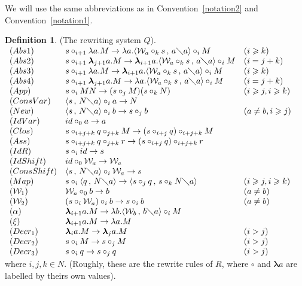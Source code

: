 \documentclass[11pt]{amsart}
\theoremstyle{plain}
\theoremstyle{definition}
\newtheorem{definition}[theorem]{Definition}
\theoremstyle{remark}
\numberwithin{equation}{section}
\newcommand{\ci}{\circ}
\newcommand{\mi}{\,,\,}
\newcommand{\is}{\diagdown}
\newcommand{\arrow}{\rightarrow}
\newcommand{\x}{a}
\newcommand{\y}{b}
\renewcommand{\pi}{\mathcal{W}}
\begin{document}
 We will use the same abbreviations as in
Convention~\ref{notation2} and Convention~\ref{notation1}.
\newpage
\begin{definition}(The rewriting system $Q$).\\[5pt]
$
\begin{array}{lll}
(Abs1) & s\ci_{i+1} \lambda \x.M\rightarrow\lambda \x.\langle
\pi_{\x}\ci_k s\mi \x\is
\x\rangle\ci_i M & (i \geqslant k)\\
(Abs2) & s\ci_{i+1} \boldsymbol{\lambda}_{j+1}
\x.M\rightarrow\boldsymbol{\lambda}_{i+1} \x.\langle \pi_{\x}\ci_k
s\mi \x\is
\x\rangle\ci_i M & (i =j+k)\\
(Abs3) & s\ci_{i+1 }\lambda
\x.M\rightarrow\boldsymbol{\lambda}_{i+1} \x.\langle \pi_{\x}\ci_k
s\mi \x\is
\x\rangle\ci_i M & (i \geqslant k)\\
(Abs4) & s\ci_{i+1} \boldsymbol{\lambda}_{j+1}
\x.M\rightarrow\lambda \x.\langle \pi_{\x}\ci_k s\mi \x\is
\x\rangle\ci_i M & (i=j+k)\\
(App) & s\ci_i MN\rightarrow(s\ci_j  M)(s\ci_k  N) & (i\geqslant j, i\geqslant k)\\
(ConsVar) & \langle s\mi N\is \x\rangle\ci_i \x\rightarrow N &\\
(New) & \langle s\mi N\is \x\rangle\ci_i \y\rightarrow  s\ci_j \y & (\x\neq \y, i\geqslant j)\\
(IdVar) &  id\ci_0 \x\rightarrow \x &\\
(Clos) & s\ci_{i+j+k} q\ci_{j+k} M\rightarrow (s\ci_{i+j} q)\ci_{i+j+k} M &\\
(Ass) & s\ci_{i+j+k} q\ci_{j+k}  r\rightarrow (s\ci_{i+j} q)\ci_{i+j+k} r &\\
(IdR) & s\ci_i id\rightarrow s &\\
(IdShift) & id\ci_0 \pi_{\x}\rightarrow\pi_{\x} &\\
(ConsShift) & \langle s\mi N\is \x\rangle\ci_i \pi_{\x}\rightarrow s &\\
(Map) & s\ci_i \langle q\mi N\is \x\rangle\rightarrow\langle
s\ci_j q \mi s\ci_k N\is \x\rangle & (i
\geqslant j, i \geqslant k)\\
(\pi_1) & \pi_{\x}\ci_0 \y\rightarrow \y & (\x\neq \y)\\
(\pi_2) & (s\ci_i\pi_{\x})\ci_i \y\rightarrow s\ci_i \y & (\x \neq
\y)\\
(\alpha) & \boldsymbol{\lambda}_{i+1} \x.M\rightarrow\lambda
\y.\langle\pi_{\y}\mi \y\is \x\rangle\ci_i M &\\
(\xi) & \boldsymbol{\lambda}_{i+1} \x.M\arrow\lambda \x.M &\\
 (Decr_1) &
\boldsymbol{\lambda}_i \x.M\arrow\boldsymbol{\lambda}_j \x.M & (i
> j)\\
(Decr_2) & s\ci_i M\arrow s\ci_j M & (i>j)\\
(Decr_3) & s\ci_i q\arrow s\ci_j q & (i>j)
\end{array}
$ \\[5pt]
where $i,j,k\in N$. (Roughly, these are the rewrite rules of $R$,
where $\ci$ and $\boldsymbol{\lambda} \x$ are labelled by theirs
own values).
\end{definition}
\end{document}
